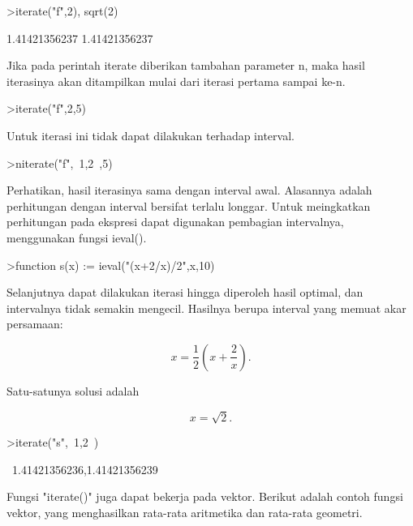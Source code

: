 \documentclass[a4paper,10pt]{article}
\begin{document}
\begin{eulernotebook}
\begin{eulercomment}
\end{eulercomment}
\begin{eulerprompt}
>iterate("f",2), sqrt(2)
\end{eulerprompt}
\begin{euleroutput}
  1.41421356237
  1.41421356237
\end{euleroutput}
\begin{eulercomment}
Jika pada perintah iterate diberikan tambahan parameter n, maka hasil
iterasinya akan ditampilkan mulai dari iterasi pertama sampai ke-n.
\end{eulercomment}
\begin{eulerprompt}
>iterate("f",2,5)
\end{eulerprompt}
\begin{euleroutput}
  [2,  1.5,  1.41667,  1.41422,  1.41421,  1.41421]
\end{euleroutput}
\begin{eulercomment}
Untuk iterasi ini tidak dapat dilakukan terhadap interval.
\end{eulercomment}
\begin{eulerprompt}
>niterate("f",~1,2~,5)
\end{eulerprompt}
\begin{euleroutput}
  [ ~1,2~,  ~1,2~,  ~1,2~,  ~1,2~,  ~1,2~,  ~1,2~ ]
\end{euleroutput}
\begin{eulercomment}
Perhatikan, hasil iterasinya sama dengan interval awal. Alasannya
adalah perhitungan dengan interval bersifat terlalu longgar. Untuk
meingkatkan perhitungan pada ekspresi dapat digunakan pembagian
intervalnya, menggunakan fungsi ieval().
\end{eulercomment}
\begin{eulerprompt}
>function s(x) := ieval("(x+2/x)/2",x,10)
\end{eulerprompt}
\begin{eulercomment}
Selanjutnya dapat dilakukan iterasi hingga diperoleh hasil optimal,
dan intervalnya tidak semakin mengecil. Hasilnya berupa interval yang
memuat akar persamaan:

\end{eulercomment}
\begin{eulerformula}
\[
x = \frac{1}{2} \left( x + \frac{2}{x} \right).
\]
\end{eulerformula}
\begin{eulercomment}
Satu-satunya solusi adalah\\
\end{eulercomment}
\begin{eulerformula}
\[
x = \sqrt2.
\]
\end{eulerformula}
\begin{eulerprompt}
>iterate("s",~1,2~)
\end{eulerprompt}
\begin{euleroutput}
  ~1.41421356236,1.41421356239~
\end{euleroutput}
\begin{eulercomment}
Fungsi "iterate()" juga dapat bekerja pada vektor. Berikut adalah
contoh fungsi vektor, yang menghasilkan rata-rata aritmetika dan
rata-rata geometri.


\end{eulercomment}
\end{eulernotebook}
\end{document}
